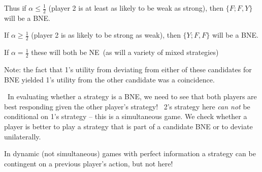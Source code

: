 \documentclass[handout]{beamer}
\begin{document}
\begin{frame}%

Thus if $\alpha \leq \frac{1}{2}$ (player 2 is at least as likely to be weak
as strong), then $\{F;F,Y\}$ will be a BNE.

\bigskip 

\pause%
If $\alpha \geq \frac{1}{2}$ (player 2 is as likely to be strong as weak),
then $\{Y;F,F\}$ will be a BNE.

\bigskip 

\pause%
If $\alpha =\frac{1}{2}$ these will both be NE\ (as will a variety of mixed
strategies)

\end{frame}%

\begin{frame}%

{\footnotesize Note: the fact that 1's utility from deviating from either of
these candidates for BNE yielded 1's utility from the other candidate was a
coincidence. }\bigskip 

{\footnotesize \ In evaluating whether a strategy is a BNE, we need to see
that both players are best responding given the other player's strategy! \
2's strategy here \textit{can not} be conditional on 1's strategy -- this is
a simultaneous game. We check whether a player is better to play a strategy
that is part of a candidate BNE or to deviate unilaterally. \ }\bigskip 

{\footnotesize In dynamic (not simultaneous) games with perfect information
a strategy can be contingent on a previous player's action, but not here!}

\end{frame}%
\end{document}
